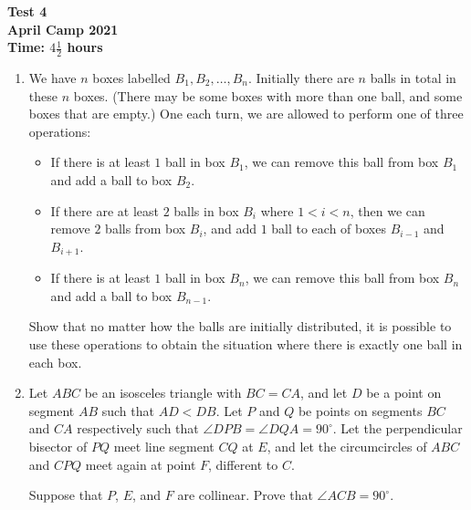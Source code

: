 \documentclass{article}
\begin{document}
\thispagestyle{empty}

\begin{center}
  \textbf{\Large Test 4}
  \\ \vspace{1em}
  \textbf{\large April Camp 2021}
  \\ \vspace{1em}
  \textbf{\large Time: $4\frac{1}{2}$ hours}
\end{center}

\vfill

\begin{enumerate}[leftmargin=0pt, itemsep=12pt]

\item %
We have $n$ boxes labelled $B_1, B_2, \dots, B_n$. Initially there are $n$ balls in total in these $n$ boxes. (There may be some boxes with more than one ball, and some boxes that are empty.) One each turn, we are allowed to perform one of three operations:
\begin{itemize}
  \item If there is at least $1$ ball in box $B_1$, we can remove this ball from box $B_1$ and add a ball to box $B_2$.
  \item If there are at least $2$ balls in box $B_i$ where $1 < i < n$, then we can remove $2$ balls from box $B_i$, and add $1$ ball to each of boxes $B_{i - 1}$ and $B_{i + 1}$.
  \item If there is at least $1$ ball in box $B_n$, we can remove this ball from box $B_n$ and add a ball to box $B_{n - 1}$.
\end{itemize}
Show that no matter how the balls are initially distributed, it is possible to use these operations to obtain the situation where there is exactly one ball in each box.


\item %
Let $ABC$ be an isosceles triangle with $BC = CA$, and let $D$ be a point on segment $AB$ such that $AD < DB$.
Let $P$ and $Q$ be points on segments $BC$ and $CA$ respectively such that $\angle DPB = \angle DQA = 90^\circ$.
Let the perpendicular bisector of $PQ$ meet line segment $CQ$ at $E$, and let the circumcircles of $ABC$ and $CPQ$ meet again at point $F$, different to $C$.

Suppose that $P$, $E$, and $F$ are collinear.
Prove that $\angle ACB = 90^\circ$.



\end{enumerate}
\end{document}
